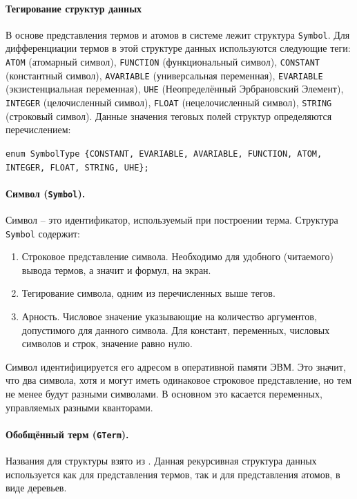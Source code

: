 \paragraph{Тегирование структур данных}
В основе представления термов и атомов в системе лежит структура \texttt{Symbol}. %
Для дифференциации термов в этой структуре данных используются следующие теги: \texttt{ATOM} (атомарный символ), \texttt{FUNCTION} (функциональный символ), \texttt{CONSTANT} (константный символ), \texttt{AVARIABLE} (универсальная переменная), \texttt{EVARIABLE} (экзистенциальная переменная), \texttt{UHE} (Неопределённый Эрбрановский Элемент), \texttt{INTEGER} (целочисленный символ), \texttt{FLOAT} (нецелочисленный символ), \texttt{STRING} (строковый символ). Данные значения теговых полей структур определяются перечислением:

{\tt enum SymbolType \{CONSTANT, EVARIABLE, AVARIABLE, FUNCTION, ATOM, INTEGER, FLOAT, STRING, UHE\};}

\paragraph{Символ (\texttt{Symbol}).}
Символ -- это идентификатор, используемый при построении терма. Структура \texttt{Symbol} содержит:
\begin{enumerate}
\item Строковое представление символа. Необходимо для удобного (читаемого) вывода термов, а значит и формул, на экран.
\item Тегирование символа, одним из перечисленных выше тегов.
\item Арность. Числовое значение указывающие на количество аргументов, допустимого для данного символа. Для констант, переменных, числовых символов и строк, значение равно нулю.
\end{enumerate}

Символ идентифицируется его адресом в оперативной памяти ЭВМ. Это значит, что два символа, хотя и могут иметь одинаковое строковое представление, но тем не менее будут разными символами. В основном это касается переменных, управляемых разными кванторами.

\paragraph{Обобщённый терм (\texttt{GTerm}).}
Названия для структуры взято из \cite{NNN}. Данная рекурсивная структура данных используется как для представления термов, так и для представления атомов, в виде деревьев.

